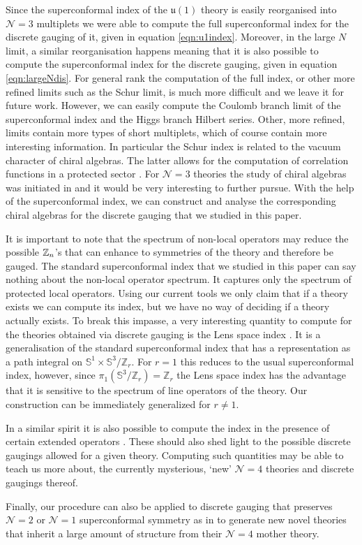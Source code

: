 \documentclass[main.tex]{subfiles}
\begin{document}
Since the superconformal index of the $\mathfrak{u}(1)$ theory is easily reorganised into $\mathcal{N}=3$ multiplets we were able to compute the full superconformal index for the discrete gauging of it, given in equation \eqref{eqn:u1index}. Moreover, in the large $N$ limit, a similar reorganisation happens meaning that it is also possible to compute the superconformal index for the discrete gauging, given in equation \eqref{eqn:largeNdis}. For general rank the computation of the full index, or other more refined limits such as the Schur limit, is much more difficult and we leave it for future work.
However, we can easily compute the Coulomb branch limit of the superconformal index and
the Higgs branch Hilbert series. Other, more refined, limits contain more types of short multiplets,
which of course contain more interesting information. In particular the Schur index is related to the vacuum character of chiral algebras.
The latter allows for the computation of correlation functions in a protected sector \cite{Beem:2013sza}. 
For $\mathcal{N}=3$ theories the study of chiral algebras  was  initiated  in \cite{Nishinaka:2016hbw,Lemos:2016xke} and it would be very interesting to further pursue.
With the help of the superconformal index, we can construct and analyse the corresponding chiral algebras for the discrete gauging that we studied in this paper.

It is important to note that the spectrum of non-local operators may reduce the possible $\mathbb{Z}_{n}$'s that can enhance to symmetries of the theory and therefore be gauged. The standard superconformal index that we studied in this paper can say nothing about the non-local operator spectrum.  It captures only the spectrum of protected local operators.
Using our current tools we only claim that if a theory exists  we can compute its index, but we have no way of deciding if a theory actually exists.
To break this impasse, a very interesting quantity to compute for the theories obtained via discrete gauging is the Lens space index \cite{Benini:2011nc,Alday:2013rs,Razamat:2013jxa,Razamat:2013opa}. It is a generalisation of the standard superconformal index that has a representation as a path integral on $\mathbb{S}^1\times \mathbb{S}^3/\mathbb{Z}_r$. For $r=1$ this reduces to the usual superconformal index, however, since $\pi_1\left(\mathbb{S}^3/\mathbb{Z}_r\right)=\mathbb{Z}_r$ the Lens space index has the advantage that it is sensitive to the spectrum of line operators of the theory.
Our construction can be immediately generalized for $r\neq1$.

In a similar spirit it is also possible to compute the index in the presence of certain extended operators \cite{Gaiotto:2012xa,Gang:2012yr}. These should also shed light to the possible discrete gaugings allowed for a given theory. Computing such quantities may be able to teach us more about, the currently mysterious, `new' $\mathcal{N}=4$ theories \cite{Argyres:2016yzz} and discrete gaugings thereof.

Finally, our procedure can also be applied to discrete gauging that preserves $\mathcal{N}=2$ or $\mathcal{N}=1$ superconformal symmetry as in \cite{Argyres:2016yzz} to generate new novel theories that inherit a large amount of structure from their $\mathcal{N}=4$ mother theory.
\end{document}
